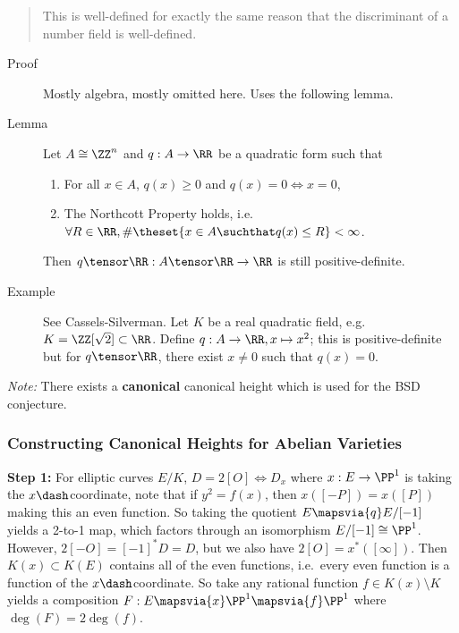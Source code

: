 \begin{quote}
This is well-defined for exactly the same reason that the discriminant
of a number field is well-defined.
\end{quote}

\begin{description}
\item[Proof]
Mostly algebra, mostly omitted here. Uses the following lemma.
\item[Lemma]
Let \(A \cong \ZZ^n\) and \(q:A\to \RR\) be a quadratic form such that

\begin{enumerate}
\def\labelenumi{\arabic{enumi}.}
\tightlist
\item
  For all \(x\in A\), \(q(x) \geq 0\) and \(q(x) = 0 \iff x=0\),
\item
  The Northcott Property holds,
  i.e.~\(\forall R\in \RR, \# \theset{x\in A \suchthat q(x) \leq R} < \infty\).
\end{enumerate}

Then \(q\tensor \RR: A\tensor \RR \to \RR\) is still positive-definite.
\item[Example]
See Cassels-Silverman. Let \(K\) be a real quadratic field,
e.g.~\(K = \ZZ[\sqrt 2] \subset \RR\). Define
\(q:A \to \RR, x\mapsto x^2\); this is positive-definite but for
\(q\tensor \RR\), there exist \(x\neq 0\) such that \(q(x) = 0\).
\end{description}

\emph{Note:} There exists a \textbf{canonical} canonical height which is
used for the BSD conjecture.

\hypertarget{constructing-canonical-heights-for-abelian-varieties}{%
\subsubsection{Constructing Canonical Heights for Abelian
Varieties}\label{constructing-canonical-heights-for-abelian-varieties}}

\textbf{Step 1:} For elliptic curves \(E/K\), \(D = 2[O] \iff D_x\)
where \(x: E\to \PP^1\) is taking the \(x\dash\)coordinate, note that if
\(y^2 = f(x)\), then \(x([-P]) = x([P])\) making this an even function.
So taking the quotient \(E \mapsvia{q} E/[-1]\) yields a 2-to-1 map,
which factors through an isomorphism \(E/[-1] \cong \PP^1\). However,
\(2[-O] = [-1]^* D = D\), but we also have \(2[O] = x^*([\infty])\).
Then \(K(x) \subset K(E)\) contains all of the even functions,
i.e.~every even function is a function of the \(x\dash\)coordinate. So
take any rational function \(f\in K(x) \setminus K\) yields a
composition \(F: E\mapsvia{x} \PP^1 \mapsvia{f} \PP^1\) where
\(\deg(F) = 2\deg(f)\).

